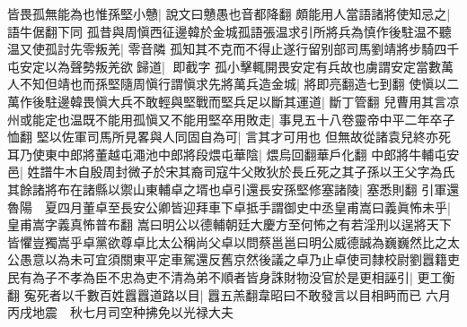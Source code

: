 皆畏孤無能為也惟孫堅小戇|{
	說文曰戇愚也音都降翻}
頗能用人當語諸將使知忌之|{
	語牛倨翻下同}
孤昔與周愼西征邊韓於金城孤語張温求引所將兵為慎作後駐温不聽温又使孤討先零叛羌|{
	零音隣}
孤知其不克而不得止遂行留别部司馬劉靖將步騎四千屯安定以為聲勢叛羌欲歸道|{
	即截字}
孤小擊輒開畏安定有兵故也虜謂安定當數萬人不知但靖也而孫堅隨周愼行謂愼求先將萬兵造金城|{
	將即亮翻造七到翻}
使愼以二萬作後駐邊韓畏愼大兵不敢輕與堅戰而堅兵足以斷其運道|{
	斷丁管翻}
兒曹用其言凉州或能定也温既不能用孤愼又不能用堅卒用敗走|{
	事見五十八卷靈帝中平二年卒子恤翻}
堅以佐軍司馬所見畧與人同固自為可|{
	言其才可用也}
但無故從諸袁兒終亦死耳乃使東中郎將董越屯澠池中郎將段煨屯華陰|{
	煨烏回翻華戶化翻}
中郎將牛輔屯安邑|{
	姓譜牛木自殷周封微子於宋其裔司寇牛父敗狄於長丘死之其子孫以王父字為氏}
其餘諸將布在諸縣以禦山東輔卓之壻也卓引還長安孫堅修塞諸陵|{
	塞悉則翻}
引軍還魯陽　夏四月董卓至長安公卿皆迎拜車下卓抵手謂御史中丞皇甫嵩曰義眞怖未乎|{
	皇甫嵩字義真怖普布翻}
嵩曰明公以德輔朝廷大慶方至何怖之有若淫刑以逞將天下皆懼豈獨嵩乎卓黨欲尊卓比太公稱尚父卓以問蔡邕邕曰明公威德誠為巍巍然比之太公愚意以為未可宜須關東平定車駕還反舊京然後議之卓乃止卓使司隸校尉劉囂籍吏民有為子不孝為臣不忠為吏不清為弟不順者皆身誅財物没官於是更相誣引|{
	更工衡翻}
寃死者以千數百姓囂囂道路以目|{
	囂五羔翻韋昭曰不敢發言以目相眄而已}
六月丙戌地震　秋七月司空种拂免以光禄大夫


